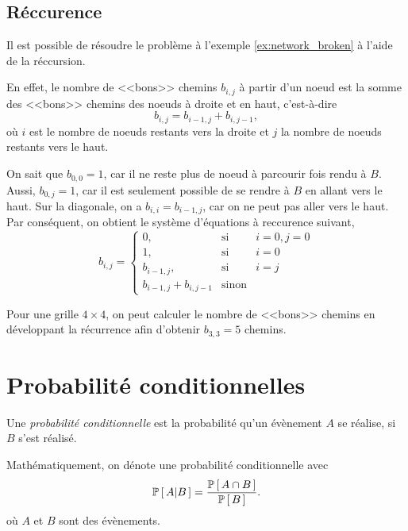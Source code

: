\documentclass[11pt]{article}
\renewcommand\P[1]{%
	\ensuremath{%
		\mathbb{P}\left[\,#1\,\right]%
	}%
}%
\newcommand\Pg[2]{%
	\ensuremath{%
		\mathbb{P}\left[\,#1\middle\rvert#2\,\right]%
	}%
}%
\begin{document}
\subsection{Réccurence}
\begin{exemple}
	Il est possible de résoudre le problème à l'exemple \ref{ex:network_broken}
	à l'aide de la réccursion.
	
	En effet, le nombre de <<bons>> chemins $b_{i,j}$ à partir d'un noeud est
	la somme des <<bons>> chemins des noeuds à droite et en haut, c'est-à-dire
	\begin{equation*}
		b_{i,j}=b_{i-1,j}+b_{i,j-1},
	\end{equation*}
	où $i$ est le nombre de noeuds restants vers la droite et $j$ la nombre de
	noeuds restants vers le haut.

	On sait que $b_{0,0}=1$, car il ne reste plus de noeud à parcourir fois
	rendu à $B$. Aussi, $b_{0,j}=1$, car il est seulement possible de se rendre
	à $B$ en allant vers le haut. Sur la diagonale, on a $b_{i,i}=b_{i-1,j}$,
	car on ne peut pas aller vers le haut. Par conséquent, on obtient le
	système d'équations à reccurence suivant,
	\begin{equation*}
		b_{i,j}=\left\{
			\begin{matrix}
				0,                 &\text{si}&i=0,j=0\\
				1,                 &\text{si}&i=0\\
				b_{i-1,j},         &\text{si}&i=j\\
				b_{i-1,j}+b_{i,j-1}&\text{sinon}
			\end{matrix}
		\right.
	\end{equation*}

	Pour une grille $4\times 4$, on peut calculer le nombre de <<bons>> chemins
	en développant la récurrence afin d'obtenir $b_{3,3}=5$ chemins.
\end{exemple}

\section{Probabilité conditionnelles}
\begin{definition}
	Une \textit{probabilité conditionnelle} est la probabilité qu'un évènement
	$A$ se réalise, si $B$ s'est réalisé.
\end{definition}

Mathématiquement, on dénote une probabilité conditionnelle avec
\begin{equation*}
	\Pg{A}{B}=\frac{\P{A\cap B}}{\P{B}}.
\end{equation*}
où $A$ et $B$ sont des évènements.
\end{document}
